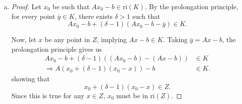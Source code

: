 \documentclass{article}
\begin{document}
\begin{solution}
\begin{enumerate}[(a)]
{\begin{proof}
                For vector $v$ that is in $N_Z(x)$, it must have \[\angles{v, z-x}\leq 0 \qquad \forall z\in Z.\] To use the definition of $Z$, we have \[\angles{v, z-x}=\angles{A\trn v,Az-Ax}=\angles{A\trn v, (Az-b)-(Ax-b)}.\] For $v$ to be in the normal cone $N_Z(x)$, the last inner product should be non-positive for all $Az-b\in K$, which means that $A\trn v$ must be in the normal cone to $K$ at the point $Ax-b$, \ie $A\trn v\in N_K(Ax-b)$. With the previous question, we can related $N_K(Ax-b)$ to $K^*$ by \[N_K(Ax-b)=\set{\lambda\in K^*\mid \angles{Ax-b, \lambda}=0}.\] So, a vector $v\in N_Z(x)$ must correspond to a $\lambda$ in the dual cone $K^*$ such that $A\trn\lambda$ has a zero inner product with $Ax-b$, hence $v=A\trn\lambda$ for some $\lambda$ satisfying $\angles{Ax-b, \lambda}=0$. To account for the fact that the normal cone $N_Z(x)$ is a closed set, we take the closure of the set $\set{A\trn\lambda\mid\lambda\in K^*,\angles{Ax-b,\lambda}=0}$ since the image under a linear transformation of a closed set is not necessarily closed. Therefore, \[N_Z(x)=\cl\set{A\trn\lambda\mid\lambda\in K^*,\angles{Ax-b,\lambda}=0}.\]
            \end{proof}
        }
        \item {
            \begin{proof}
                Let \( x_0 \) be such that \( Ax_0 - b \in \text{ri}(K) \). By the prolongation principle, for every point \( \bar{y} \in K \), there exists \( \delta > 1 \) such that
                \[ Ax_0 - b + (\delta - 1)(Ax_0 - b - \bar{y}) \in K. \]

                Now, let \( x \) be any point in \( Z \), implying \( Ax - b \in K \).
                Taking \( \bar{y} = Ax - b \), the prolongation principle gives us
                \begin{align*}
                    Ax_0 - b + (\delta - 1)((Ax_0 - b) - (Ax - b)) &\in K \\
                    \Rightarrow A(x_0 + (\delta - 1)(x_0 - x))-b &\in K.
                \end{align*}
                showing that
                \[ x_0 + (\delta - 1)(x_0 - x) \in Z. \]
                Since this is true for any \( x \in Z \), \( x_0 \) must be in \( \text{ri}(Z) \).


\end{proof}}
\end{enumerate}
\end{solution}
\end{document}
